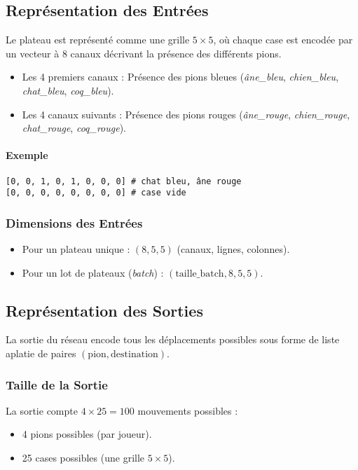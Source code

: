 \documentclass[]{article}
\begin{document}
\subsection{Représentation des Entrées}
Le plateau est représenté comme une grille \(5 \times 5\), où chaque case est encodée par un vecteur à 8 canaux décrivant la présence des différents pions.

\begin{itemize}
    \item Les 4 premiers canaux : Présence des pions bleues (\textit{âne\_bleu}, \textit{chien\_bleu}, \textit{chat\_bleu}, \textit{coq\_bleu}).
    \item Les 4 canaux suivants : Présence des pions rouges (\textit{âne\_rouge}, \textit{chien\_rouge}, \textit{chat\_rouge}, \textit{coq\_rouge}).
\end{itemize}

\paragraph{Exemple}

\begin{verbatim}
[0, 0, 1, 0, 1, 0, 0, 0] # chat bleu, âne rouge
[0, 0, 0, 0, 0, 0, 0, 0] # case vide
\end{verbatim}

\subsubsection{Dimensions des Entrées}
\begin{itemize}
    \item Pour un plateau unique : \((8, 5, 5)\) (canaux, lignes, colonnes).
    \item Pour un lot de plateaux (\textit{batch}) : \((\text{taille\_batch}, 8, 5, 5)\).
\end{itemize}

\subsection{Représentation des Sorties}
La sortie du réseau encode tous les déplacements possibles sous forme de liste aplatie de paires \((\text{pion}, \text{destination})\).

\subsubsection{Taille de la Sortie}
La sortie compte \(4 \times 25 = 100\) mouvements possibles :
\begin{itemize}
    \item 4 pions possibles (par joueur).
    \item 25 cases possibles (une grille \(5 \times 5\)).
\end{itemize}
\end{document}
